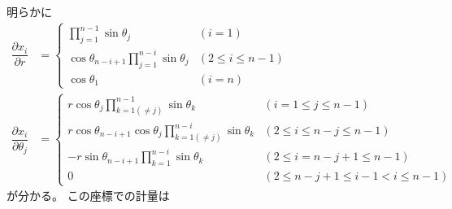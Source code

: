 明らかに
\begin{subequations}
\begin{align}
    \dfrac{\partial x_i}
        {\partial r}
&=
    \begin{cases}
    \displaystyle
        \prod_{j=1}^{n - 1}
        \sin \theta_j
    &(i = 1)
    \\
    \displaystyle
        \cos \theta_{n - i + 1}
        \prod_{j=1}^{n - i}
        \sin \theta_j
    &(2 \le i \le n - 1)
    \\
    \displaystyle
        \cos \theta_{1}
    &(i = n)
    \end{cases}
\\
    \dfrac{\partial x_i}
        {\partial \theta_j}
&=
    \begin{cases}
    \displaystyle
        r \cos \theta_j
        \prod_{k=1 (\neq j)}^{n-1}
        \sin \theta_k
    &(i = 1 \le j \le n - 1)
    \\
    \displaystyle
        r \cos \theta_{n - i + 1}
        \cos \theta_j
        \prod_{k=1 (\neq j)}^{n - i}
        \sin \theta_k
    &(2 \le i \le n - j \le n - 1)
    \\
    \displaystyle
        -
        r \sin \theta_{n - i + 1}
        \prod_{k=1}^{n - i}
        \sin \theta_k
    &(2 \le i = n - j + 1 \le n - 1)
    \\
    \displaystyle
        0
    &(2 \le n-j+1 \le i - 1 < i \le n - 1)
    \end{cases}
\end{align}
\end{subequations}
が分かる。
この座標での計量は
